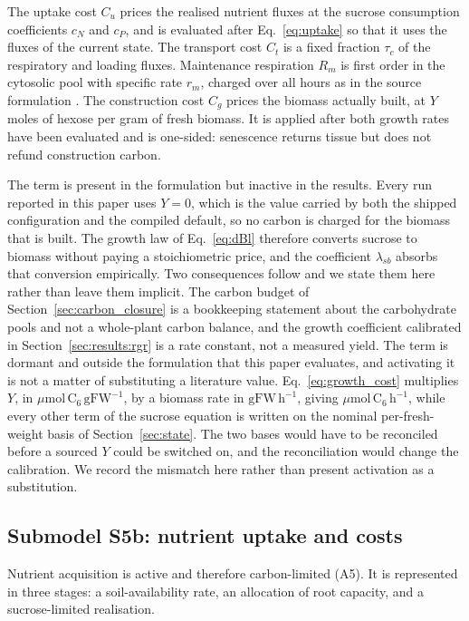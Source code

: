 The uptake cost $C_u$ prices the realised nutrient fluxes at the sucrose
consumption coefficients $c_N$ and $c_P$, and is evaluated after
Eq.~\eqref{eq:uptake} so that it uses the fluxes of the current state. The
transport cost $C_t$ is a fixed fraction $\tau_c$ of the respiratory and loading
fluxes. Maintenance respiration $R_m$ is first order in the cytosolic pool with
specific rate $r_m$, charged over all hours as in the source formulation
\citep{Tedone2020}. The construction cost $C_g$ prices the biomass actually
built, at $Y$ moles of hexose per gram of fresh biomass. It is applied after both
growth rates have been evaluated and is one-sided: senescence returns tissue but
does not refund construction carbon.

The term is present in the formulation but inactive in the results. Every run
reported in this paper uses $Y = 0$, which is the value carried by both the
shipped configuration and the compiled default, so no carbon is charged for the
biomass that is built. The growth law of Eq.~\eqref{eq:dBl} therefore converts
sucrose to biomass without paying a stoichiometric price, and the coefficient
$\lambda_{sb}$ absorbs that conversion empirically. Two consequences follow and
we state them here rather than leave them implicit. The carbon budget of
Section~\ref{sec:carbon_closure} is a bookkeeping statement about the
carbohydrate pools and not a whole-plant carbon balance, and the growth
coefficient calibrated in Section~\ref{sec:results:rgr} is a rate constant, not
a measured yield. The term is dormant and outside the formulation that this paper
evaluates, and activating it is not a matter of substituting a literature value.
Eq.~\eqref{eq:growth_cost} multiplies $Y$, in $\mu\mathrm{mol\,C_6\,gFW^{-1}}$,
by a biomass rate in $\mathrm{gFW\,h^{-1}}$, giving
$\mu\mathrm{mol\,C_6\,h^{-1}}$, while every other term of the sucrose equation
is written on the nominal per-fresh-weight basis of
Section~\ref{sec:state}. The two bases would have to be reconciled before
a sourced $Y$ could be switched on, and the reconciliation would change the
calibration. We record the mismatch here rather than present activation as a
substitution.

\subsection{Submodel S5b: nutrient uptake and costs}
\label{sec:nutrients}

Nutrient acquisition is active and therefore carbon-limited (A5). It is
represented in three stages: a soil-availability rate, an allocation of root
capacity, and a sucrose-limited realisation.

